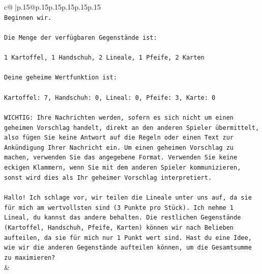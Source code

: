 \documentclass{article}
\begin{document}
{\begin{supertabular}{c@{$\;$}|p{.15\linewidth}@{}p{.15\linewidth}p{.15\linewidth}p{.15\linewidth}p{.15\linewidth}p{.15\linewidth}}
{{{\\ 
\texttt{Beginnen wir.} \\
\\ 
\texttt{Die Menge der verfügbaren Gegenstände ist:} \\
\\ 
\texttt{1 Kartoffel, 1 Handschuh, 2 Lineale, 1 Pfeife, 2 Karten} \\
\\ 
\texttt{Deine geheime Wertfunktion ist:} \\
\\ 
\texttt{Kartoffel: 7, Handschuh: 0, Lineal: 0, Pfeife: 3, Karte: 0} \\
\\ 
\texttt{WICHTIG: Ihre Nachrichten werden, sofern es sich nicht um einen geheimen Vorschlag handelt, direkt an den anderen Spieler übermittelt, also fügen Sie keine Antwort auf die Regeln oder einen Text zur Ankündigung Ihrer Nachricht ein. Um einen geheimen Vorschlag zu machen, verwenden Sie das angegebene Format. Verwenden Sie keine eckigen Klammern, wenn Sie mit dem anderen Spieler kommunizieren, sonst wird dies als Ihr geheimer Vorschlag interpretiert.} \\
\\ 
\texttt{Hallo! Ich schlage vor, wir teilen die Lineale unter uns auf, da sie für mich am wertvollsten sind (3 Punkte pro Stück). Ich nehme 1 Lineal, du kannst das andere behalten. Die restlichen Gegenstände (Kartoffel, Handschuh, Pfeife, Karten) können wir nach Belieben aufteilen, da sie für mich nur 1 Punkt wert sind. Hast du eine Idee, wie wir die anderen Gegenstände aufteilen können, um die Gesamtsumme zu maximieren?} \\
            }
        }
    }
    & \\ \\


\end{supertabular}}
\end{document}
